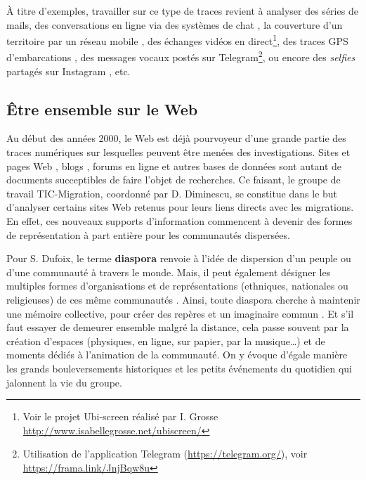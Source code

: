 \documentclass[symmetric,justified,marginals=raggedouter]{tufte-book}
\begin{document}
À titre d'exemples, travailler sur ce type de traces revient à analyser des séries de mails, des conversations en ligne via des systèmes de chat \citep{dekker_smart_2018}, la couverture d'un territoire par un réseau mobile \citep{sanchez-querubin_connected_2018}, des échanges vidéos en direct\footnote{\RaggedOuter Voir le projet Ubi-screen réalisé par I. Grosse \url{http://www.isabellegrosse.net/ubiscreen/}}, des traces GPS d'embarcations \citep{heller__2014}, des messages vocaux postés sur Telegram\footnote{\RaggedOuter Utilisation de l'application Telegram (\url{https://telegram.org/}), voir \url{https://frama.link/JnjBqw8u}}, ou encore des \textit{selfies} partagés sur Instagram \citep{risam_now_2018}, etc. 

\subsection{Être ensemble sur le Web}

\noindent Au début des années 2000, le Web est déjà pourvoyeur d'une grande partie des traces numériques sur lesquelles peuvent être menées des investigations.  Sites et pages Web \citep{tyner_pan-national_2000}, blogs \citep{park_developing_2008}, forums en ligne \citep{van_den_bos_territorial_2006} et autres bases de données sont autant de documents succeptibles de faire l'objet de recherches. Ce faisant, le groupe de travail TIC-Migration, coordonné par D. Diminescu, se constitue dans le but d'analyser certains sites Web retenus pour leurs liens directs avec les migrations. En effet, ces nouveaux supports d'information commencent à devenir des formes de représentation à part entière pour les communautés dispersées. 

Pour S. Dufoix, le terme \textbf{diaspora} renvoie à l'idée de dispersion d'un peuple ou d'une communauté à travers le monde. Mais, il peut également désigner les multiples formes d'organisations et de représentations (ethniques, nationales ou religieuses) de ces même communautés \citep{dufoix_les_2003}. Ainsi, toute diaspora cherche à maintenir une mémoire collective, pour créer des repères et un imaginaire commun \citep{bernal_diaspora_2006}. Et s'il faut essayer de demeurer ensemble malgré la distance, cela passe souvent par la création d'espaces (physiques, en ligne, sur papier, par la musique\ldots{}) et de moments dédiés à l'animation de la communauté. On y évoque d'égale manière les grands bouleversements historiques et les petits événements du quotidien \citep{koukoutsaki-monnier_deterritorialising_2012} qui jalonnent la vie du groupe. 
\end{document}
